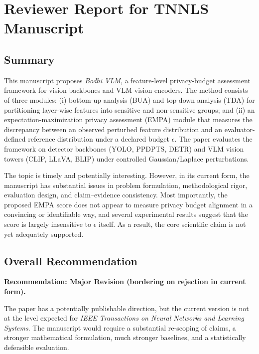 \section*{Reviewer Report for TNNLS Manuscript}

\subsection*{Summary}
This manuscript proposes \emph{Bodhi VLM}, a feature-level privacy-budget assessment framework for vision backbones and VLM vision encoders. The method consists of three modules: (i) bottom-up analysis (BUA) and top-down analysis (TDA) for partitioning layer-wise features into sensitive and non-sensitive groups; and (ii) an expectation-maximization privacy assessment (EMPA) module that measures the discrepancy between an observed perturbed feature distribution and an evaluator-defined reference distribution under a declared budget $\epsilon$. The paper evaluates the framework on detector backbones (YOLO, PPDPTS, DETR) and VLM vision towers (CLIP, LLaVA, BLIP) under controlled Gaussian/Laplace perturbations.

The topic is timely and potentially interesting. However, in its current form, the manuscript has substantial issues in problem formulation, methodological rigor, evaluation design, and claim--evidence consistency. Most importantly, the proposed EMPA score does not appear to measure privacy budget alignment in a convincing or identifiable way, and several experimental results suggest that the score is largely insensitive to $\epsilon$ itself. As a result, the core scientific claim is not yet adequately supported.

\subsection*{Overall Recommendation}
\textbf{Recommendation: Major Revision (bordering on rejection in current form).}

The paper has a potentially publishable direction, but the current version is not at the level expected for \emph{IEEE Transactions on Neural Networks and Learning Systems}. The manuscript would require a substantial re-scoping of claims, a stronger mathematical formulation, much stronger baselines, and a statistically defensible evaluation.

